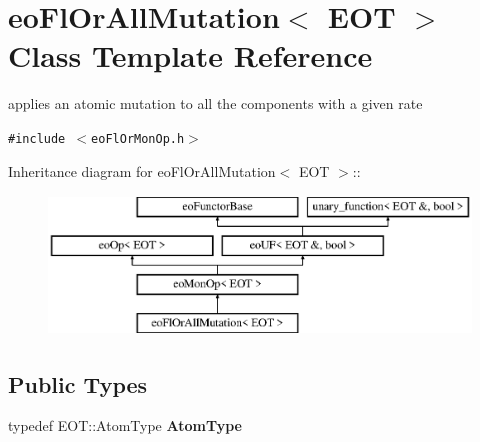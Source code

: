 \section{eo\-Fl\-Or\-All\-Mutation$<$ EOT $>$ Class Template Reference}
\label{classeo_fl_or_all_mutation}
applies an atomic mutation to all the components with a given rate  


{\tt \#include $<$eo\-Fl\-Or\-Mon\-Op.h$>$}

Inheritance diagram for eo\-Fl\-Or\-All\-Mutation$<$ EOT $>$::\begin{figure}[H]
\begin{center}
\leavevmode
\includegraphics[height=3.71476cm]{classeo_fl_or_all_mutation}
\end{center}
\end{figure}
\subsection*{Public Types}
\begin{CompactItemize}
\item 
typedef EOT::Atom\-Type {\bf Atom\-Type}\label{classeo_fl_or_all_mutation_w0}

\end{CompactItemize}
